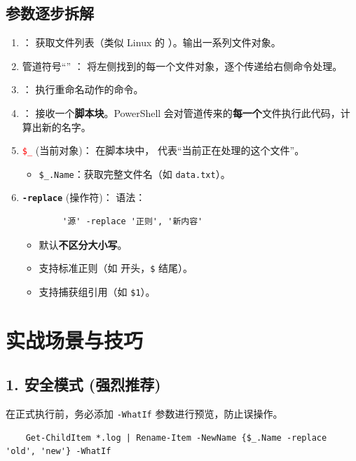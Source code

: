 \documentclass[CJKmath=true,10pt]{MyBook}
\begin{document}
\subsection{参数逐步拆解}
\begin{enumerate}
	\item {}：
	获取文件列表（类似 Linux 的 ）。输出一系列文件对象。
	
	\item 管道符号“\ci{|}” ：
	将左侧找到的每一个文件对象，逐个传递给右侧命令处理。
	
	\item {}：
	执行重命名动作的命令。
	
	\item {}：
	接收一个\textbf{脚本块}。PowerShell 会对管道传来的\textbf{每一个}文件执行此代码，计算出新的名字。
	
	\item \textcolor{red}{\texttt{\$\_}} (当前对象)：
	在脚本块中，\ci{\$\_} 代表“当前正在处理的这个文件”。
	\begin{itemize}
		\item \texttt{\$\_.Name}：获取完整文件名（如 \texttt{data.txt}）。
	\end{itemize}
	
	\item \textbf{\texttt{-replace}} (操作符)：
	语法：
	\begin{lstlisting}
		'源' -replace '正则', '新内容'
	\end{lstlisting}
	\begin{itemize}
		\item 默认\textbf{不区分大小写}。
		\item 支持标准正则（如 \ci{^} 开头，\texttt{\$} 结尾）。
		\item 支持捕获组引用（如 \texttt{\$1}）。
	\end{itemize}
\end{enumerate}

\section{实战场景与技巧}

\subsection{1. 安全模式 (强烈推荐)}
在正式执行前，务必添加 \texttt{-WhatIf} 参数进行预览，防止误操作。
\begin{lstlisting}
	Get-ChildItem *.log | Rename-Item -NewName {$_.Name -replace 'old', 'new'} -WhatIf
\end{lstlisting}
\end{document}
